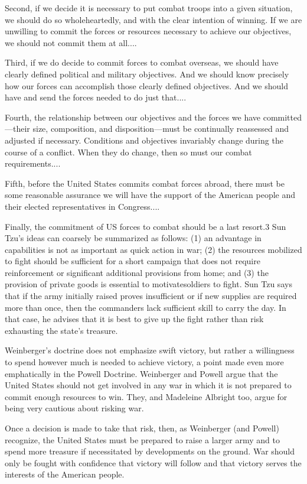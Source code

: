 \documentclass[10pt]{article}
\begin{document}
{\large Second, if we decide it is necessary to put combat troops into a given
situation, we should do so wholeheartedly, and with the clear intention of
winning. If we are unwilling to commit the forces or resources necessary to
achieve our objectives, we should not commit them at all....}

{\large Third, if we do decide to commit forces to combat overseas, we should
have clearly defined political and military objectives. And we should know
precisely how our forces can accomplish those clearly defined objectives. And we
should have and send the forces needed to do just that....}

{\large Fourth, the relationship between our objectives and the forces we have
committed---their size, composition, and disposition---must be continually
reassessed and adjusted if necessary. Conditions and objectives invariably change
during the course of a conflict. When they do change, then so must our combat
requirements....}

{\large Fifth, before the United States commits combat forces abroad, there must
be some reasonable assurance we will have the support of the American people and
their elected representatives in Congress....}

{\large Finally, the commitment of US forces to combat should be a last resort.3
Sun Tzu's ideas can coarsely be summarized as follows: (1) an advantage in
capabilities is not as important as quick action in war; (2) the resources
mobilized to fight should be sufficient for a short campaign that does not
require reinforcement or significant additional provisions from home; and (3) the
provision of private goods is essential to motivatesoldiers to fight. Sun Tzu
says that if the army initially raised proves insufficient or if new supplies are
required more than once, then the commanders lack sufficient skill to carry the
day. In that case, he advises that it is best to give up the fight rather than
risk exhausting the state's treasure.}

{\large Weinberger's doctrine does not emphasize swift victory, but rather a
willingness to spend however much is needed to achieve victory, a point made even
more emphatically in the Powell Doctrine. Weinberger and Powell argue that the
United States should not get involved in any war in which it is not prepared to
commit enough resources to win. They, and Madeleine Albright too, argue for being
very cautious about risking war.}

{\large Once a decision is made to take that risk, then, as Weinberger (and
Powell) recognize, the United States must be prepared to raise a larger army and
to spend more treasure if necessitated by developments on the ground. War should
only be fought with confidence that victory will follow and that victory serves
the interests of the American people.}
\end{document}
